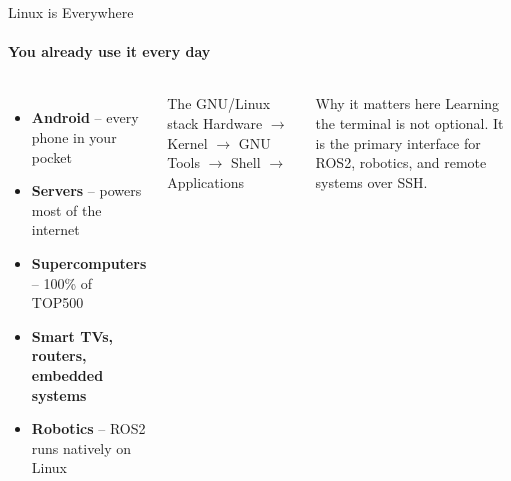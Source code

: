 \documentclass[aspectratio=169]{beamer}
\begin{document}
\begin{frame}{Linux is Everywhere}
  \framesubtitle{You already use it every day}
  \begin{columns}
      \begin{itemize}
        \item \textbf{Android} -- every phone in your pocket
        \item \textbf{Servers} -- powers most of the internet
        \item \textbf{Supercomputers} -- 100\% of TOP500
        \item \textbf{Smart TVs, routers, embedded systems}
        \item \textbf{Robotics} -- ROS2 runs natively on Linux
      \end{itemize}
      \vspace{0.4em}
      \begin{block}{The GNU/Linux stack}
        Hardware $\rightarrow$ Kernel $\rightarrow$ GNU Tools
        $\rightarrow$ Shell $\rightarrow$ Applications
      \end{block}
      \begin{alertblock}{Why it matters here}
        Learning the terminal is not optional.
        It is the primary interface for ROS2,
        robotics, and remote systems over SSH.
      \end{alertblock}
  \end{columns}
\end{frame}
\end{document}
